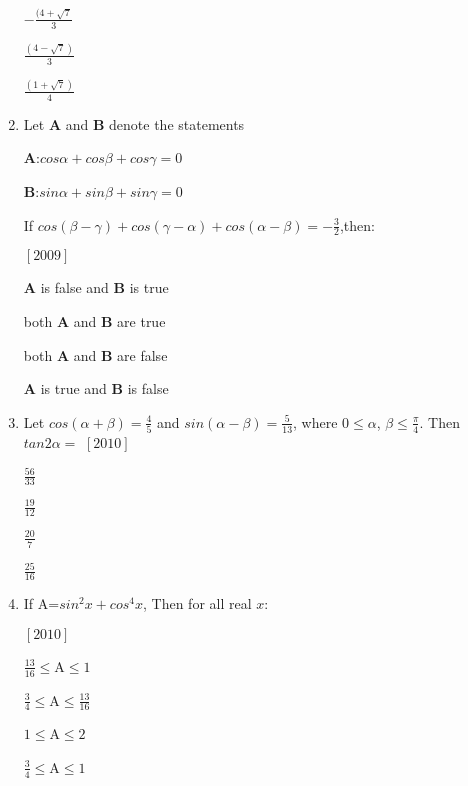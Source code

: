 \documentclass[journal,12pt,twocolumn]{IEEEtran}
\theoremstyle{remark}
\begin{document}
\begin{enumerate}[label={\arabic*}.]
\begin{multicols}{2}
 $-\frac{(4+\sqrt{7}}{3}$
\columnbreak

 $\frac{(4-\sqrt{7})}{3}$

 $\frac{(1+\sqrt{7})}{4}$

\end{multicols}

\medskip

\item Let \textbf{A} and \textbf{B} denote the statements

\textbf{A}:$cos\alpha+cos\beta+cos\gamma=0$

\textbf{B}:$sin\alpha+sin\beta+sin\gamma=0$

If $cos(\beta-\gamma)+cos(\gamma-\alpha)+cos(\alpha-\beta)=-\frac{3}{2}$,then:

\smallskip
\hfill{$[2009]$}

\medskip
{} \textbf{A} is false and \textbf{B} is true 

 both \textbf{A} and \textbf{B} are true

 both \textbf{A} and \textbf{B} are false 

 \textbf{A} is true and \textbf{B} is false

\medskip
\item Let $cos(\alpha+\beta)=\frac{4}{5}$  and $sin(\alpha-\beta)=\frac{5}{13}$, where $0\le\alpha$, $\beta\le\frac{\pi}{4}$. Then $tan2\alpha=$ \hfill{$[2010]$}
\begin{multicols}{4}

 $\frac{56}{33}$
\columnbreak

 $\frac{19}{12}$
\columnbreak

 $\frac{20}{7}$
\columnbreak

 $\frac{25}{16}$

\end{multicols}

\item If A=$sin^2x +cos^4 x$, Then for all real $x$:

\hfill{$[2010]$}
\medskip

\begin{multicols}{2}

 $\frac{13}{16}\le$A$\le1$

 $\frac{3}{4}\le$A$\le\frac{13}{16}$
\columnbreak

 $1\le$A$\le2$

 $\frac{3}{4}\le$A$\le1$
\end{multicols}


\end{enumerate}
\end{document}
